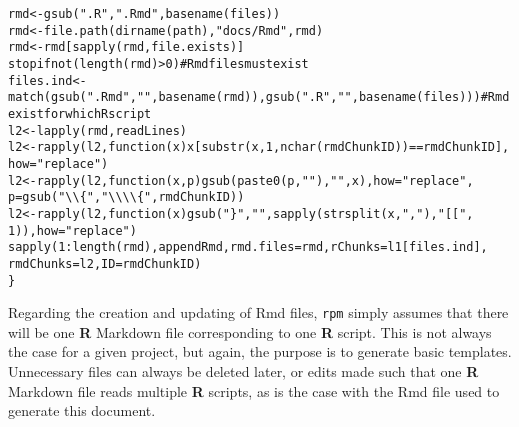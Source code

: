 \documentclass{article}\usepackage[]{graphicx}\usepackage[]{color}
\makeatletter
\newcommand{\hlnum}[1]{\textcolor[rgb]{0.863,0.196,0.184}{#1}}%
\newcommand{\hlstr}[1]{\textcolor[rgb]{0.863,0.196,0.184}{#1}}%
\newcommand{\hlcom}[1]{\textcolor[rgb]{0.345,0.431,0.459}{#1}}%
\newcommand{\hlopt}[1]{\textcolor[rgb]{0.576,0.631,0.631}{#1}}%
\newcommand{\hlstd}[1]{\textcolor[rgb]{0.514,0.58,0.588}{#1}}%
\newcommand{\hlkwa}[1]{\textcolor[rgb]{0.796,0.294,0.086}{#1}}%
\newcommand{\hlkwb}[1]{\textcolor[rgb]{0.522,0.6,0}{#1}}%
\newcommand{\hlkwc}[1]{\textcolor[rgb]{0.796,0.294,0.086}{#1}}%
\newcommand{\hlkwd}[1]{\textcolor[rgb]{0.576,0.631,0.631}{#1}}%
\newenvironment{kframe}{%
 \def\at@end@of@kframe{}%
 \ifinner\ifhmode%
  \def\at@end@of@kframe{\end{minipage}}%
  \begin{minipage}{\columnwidth}%
 \fi\fi%
 \def\FrameCommand##1{\hskip\@totalleftmargin \hskip-\fboxsep
 \colorbox{shadecolor}{##1}\hskip-\fboxsep
     \hskip-\linewidth \hskip-\@totalleftmargin \hskip\columnwidth}%
 \MakeFramed {\advance\hsize-\width
   \@totalleftmargin\z@ \linewidth\hsize
   \@setminipage}}%
 {\par\unskip\endMakeFramed%
 \at@end@of@kframe}
\newenvironment{knitrout}{}{} %
\makeatother
\begin{document}
\begin{knitrout}
\begin{kframe}
\begin{alltt}
    \hlstd{rmd} \hlkwb{<-} \hlkwd{gsub}\hlstd{(}\hlstr{".R"}\hlstd{,} \hlstr{".Rmd"}\hlstd{,} \hlkwd{basename}\hlstd{(files))}
    \hlstd{rmd} \hlkwb{<-} \hlkwd{file.path}\hlstd{(}\hlkwd{dirname}\hlstd{(path),} \hlstr{"docs/Rmd"}\hlstd{, rmd)}
    \hlstd{rmd} \hlkwb{<-} \hlstd{rmd[}\hlkwd{sapply}\hlstd{(rmd, file.exists)]}
    \hlkwd{stopifnot}\hlstd{(}\hlkwd{length}\hlstd{(rmd)} \hlopt{>} \hlnum{0}\hlstd{)}  \hlcom{# Rmd files must exist}
    \hlstd{files.ind} \hlkwb{<-} \hlkwd{match}\hlstd{(}\hlkwd{gsub}\hlstd{(}\hlstr{".Rmd"}\hlstd{,} \hlstr{""}\hlstd{,} \hlkwd{basename}\hlstd{(rmd)),} \hlkwd{gsub}\hlstd{(}\hlstr{".R"}\hlstd{,} \hlstr{""}\hlstd{,} \hlkwd{basename}\hlstd{(files)))}  \hlcom{# Rmd exist for which R script}
    \hlstd{l2} \hlkwb{<-} \hlkwd{lapply}\hlstd{(rmd, readLines)}
    \hlstd{l2} \hlkwb{<-} \hlkwd{rapply}\hlstd{(l2,} \hlkwa{function}\hlstd{(}\hlkwc{x}\hlstd{) x[}\hlkwd{substr}\hlstd{(x,} \hlnum{1}\hlstd{,} \hlkwd{nchar}\hlstd{(rmdChunkID))} \hlopt{==} \hlstd{rmdChunkID],}
        \hlkwc{how} \hlstd{=} \hlstr{"replace"}\hlstd{)}
    \hlstd{l2} \hlkwb{<-} \hlkwd{rapply}\hlstd{(l2,} \hlkwa{function}\hlstd{(}\hlkwc{x}\hlstd{,} \hlkwc{p}\hlstd{)} \hlkwd{gsub}\hlstd{(}\hlkwd{paste0}\hlstd{(p,} \hlstr{" "}\hlstd{),} \hlstr{""}\hlstd{, x),} \hlkwc{how} \hlstd{=} \hlstr{"replace"}\hlstd{,}
        \hlkwc{p} \hlstd{=} \hlkwd{gsub}\hlstd{(}\hlstr{"\textbackslash{}\textbackslash{}\{"}\hlstd{,} \hlstr{"\textbackslash{}\textbackslash{}\textbackslash{}\textbackslash{}\{"}\hlstd{, rmdChunkID))}
    \hlstd{l2} \hlkwb{<-} \hlkwd{rapply}\hlstd{(l2,} \hlkwa{function}\hlstd{(}\hlkwc{x}\hlstd{)} \hlkwd{gsub}\hlstd{(}\hlstr{"\}"}\hlstd{,} \hlstr{""}\hlstd{,} \hlkwd{sapply}\hlstd{(}\hlkwd{strsplit}\hlstd{(x,} \hlstr{","}\hlstd{),} \hlstr{"[["}\hlstd{,}
        \hlnum{1}\hlstd{)),} \hlkwc{how} \hlstd{=} \hlstr{"replace"}\hlstd{)}
    \hlkwd{sapply}\hlstd{(}\hlnum{1}\hlopt{:}\hlkwd{length}\hlstd{(rmd), appendRmd,} \hlkwc{rmd.files} \hlstd{= rmd,} \hlkwc{rChunks} \hlstd{= l1[files.ind],}
        \hlkwc{rmdChunks} \hlstd{= l2,} \hlkwc{ID} \hlstd{= rmdChunkID)}
\hlstd{\}}
\end{alltt}
\end{kframe}
\end{knitrout}

Regarding the creation and updating of Rmd files, \texttt{rpm} simply assumes that there will be one \textbf{R} Markdown file corresponding to one \textbf{R} script.
This is not always the case for a given project, but again, the purpose is to generate basic templates.
Unnecessary files can always be deleted later, or edits made such that one \textbf{R} Markdown file reads multiple \textbf{R} scripts,
as is the case with the Rmd file used to generate this document.
\end{document}

